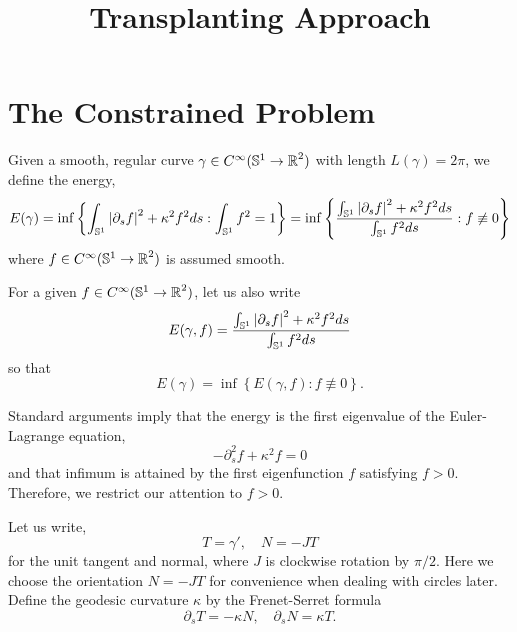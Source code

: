 \documentclass[12pt]{article}
\title{Transplanting Approach}
\date{}
\begin{document}
\maketitle

\section{The Constrained Problem}

Given a smooth, regular curve \(\gamma \in C^{\infty}(\operatorname{\mathbb{S}^1} \to \operatorname{\mathbb{R}}^2)\) with length \(L(\gamma) = 2\pi\), we define the energy,
\begin{equation}
\label{eq:Egamma}
E(\gamma) = \inf\left\{\int_{\operatorname{\mathbb{S}^1}} \left|{\partial_s f}\right|^2 + \kappa^2 f^2 ds : \int_{\operatorname{\mathbb{S}^1}} f^2 = 1\right\} = \inf\left\{\frac{\int_{\operatorname{\mathbb{S}^1}} \left|{\partial_s f}\right|^2 + \kappa^2 f^2 ds}{\int_{\operatorname{\mathbb{S}^1}} f^2 ds} : f \not\equiv 0\right\}
\end{equation}
where \(f \in C^{\infty}(\operatorname{\mathbb{S}^1} \to \operatorname{\mathbb{R}}^2)\) is assumed smooth.

For a given \(f \in C^{\infty}(\operatorname{\mathbb{S}^1} \to \operatorname{\mathbb{R}}^2)\), let us also write
\begin{equation}
\label{eq:Egammaf}
E(\gamma, f) = \frac{\int_{\operatorname{\mathbb{S}^1}} \left|{\partial_s f}\right|^2 + \kappa^2 f^2 ds}{\int_{\operatorname{\mathbb{S}^1}} f^2 ds}
\end{equation}
so that
\begin{equation}
\label{eq:EgammaEgammaf}
E(\gamma) = \inf\left\{E(\gamma, f) : f \not\equiv 0\right\}.
\end{equation}

Standard arguments imply that the energy is the first eigenvalue of the Euler-Lagrange equation,
\begin{equation}
\label{eq:ELf}
-\partial_s^2 f + \kappa^2 f = 0
\end{equation}
and that infimum is attained by the first eigenfunction \(f\) satisfying \(f > 0\). Therefore, we restrict our attention to \(f > 0\).

Let us write,
\begin{equation}
\label{eq:TN}
T = \gamma', \quad N = -J T
\end{equation}
for the unit tangent and normal, where $J$ is clockwise rotation by $\pi/2$. Here we choose the orientation \(N = -JT\) for convenience when dealing with circles later. Define the geodesic curvature \(\kappa\) by the Frenet-Serret formula
\begin{equation}
\label{eq:FS}
\partial_s T = - \kappa N, \quad \partial_s N = \kappa T.
\end{equation}
\end{document}
